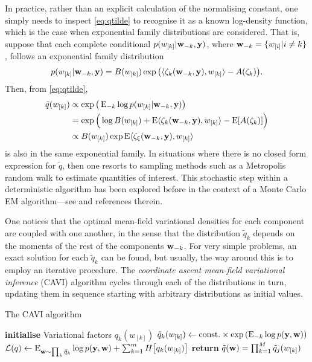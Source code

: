 In practice, rather than an explicit calculation of the normalising constant, one simply needs to inspect \cref{eq:qtilde} to recognise it as a known log-density function, which is the case when exponential family distributions are considered.
That is, suppose that each complete conditional $p(w_{[k]}|{\mathbf w}_{-k}, {\mathbf y})$, where ${\mathbf w}_{-k} = \{w_{[i]} | i \neq k\}$, follows an exponential family distribution
\[
  p(w_{[k]}| {\mathbf w}_{-k}, {\mathbf y} ) 
  = B(w_{[k]})\exp \big(\langle\zeta_k({\mathbf w}_{-k}, {\mathbf y}) , w_{[k]}\rangle - A(\zeta_k) \big).
\]
Then, from \cref{eq:qtilde},
\begin{align*}
  \tilde q(w_{[k]})
  &\propto \exp\big(\operatorname{E}_{-k}\log p(w_{[k]}| {\mathbf w}_{-k}, {\mathbf y}) \big) \\
  &= \exp \Big(\log B(w_{[k]}) + \operatorname{E} \langle\zeta_k({\mathbf w}_{-k}, {\mathbf y}) , w_{[k]}\rangle - \operatorname{E} [ A(\zeta_k) ] \Big) \\
  &\propto B(w_{[k]})\exp \operatorname{E}\langle\zeta_\xi({\mathbf w}_{-k}, {\mathbf y}) , w_{[k]}\rangle
\end{align*}
is also in the same exponential family.
In situations where there is no closed form expression for $\tilde q$, then one resorts to sampling methods such as a Metropolis random walk to estimate quantities of interest.
This stochastic step within a deterministic algorithm has been explored before in the context of a Monte Carlo EM algorithm---see \citet[§4, pp. 537--538]{meng1997algorithm} and references therein.

One notices that the optimal mean-field variational densities for each component are coupled with one another, in the sense that the distribution $\tilde q_k$ depends on the moments of the rest of the components ${\mathbf w}_{-k}$.
For very simple problems, an exact solution for each $\tilde q_k$ can be found, but usually, the way around this is to employ an iterative procedure.
The \emph{coordinate ascent mean-field variational inference} (CAVI) algorithm cycles through each of the distributions in turn, updating them in sequence starting with arbitrary distributions as initial values.

\begin{algorithm}[H]
\caption{The CAVI algorithm}\label{alg:cavi}
  \begin{algorithmic}[1]
    \State \textbf{initialise} Variational factors $q_k(w_{[k]})$
        \State $\tilde q_k(w_{[k]}) \gets \text{const.}\hspace{0.01em} \times \exp \left( \operatorname{E}_{-k}\log p({\mathbf y},{\mathbf w}) \right)$ 
      \EndFor
      \State ${\mathcal L}(q) \gets \operatorname{E}_{{\mathbf w} \sim \prod_k\tilde q_k}\log p({\mathbf y}, {\mathbf w}) + \sum_{k=1}^m H\big[ q_k(w_{[k]})\big]$ 
    \EndWhile
    \State \textbf{return} $\tilde q({\mathbf w}) = \prod_{k=1}^M \tilde q_j(w_{[k]})$ 
  \end{algorithmic}
\end{algorithm}

